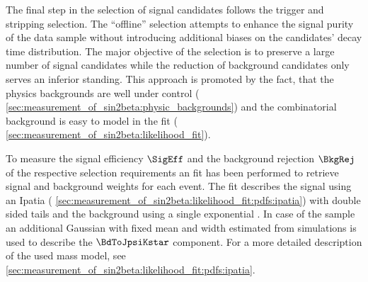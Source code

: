 The final step in the selection of signal candidates follows the trigger and
stripping selection. The \enquote{offline} selection attempts to enhance the
signal purity of the data sample without introducing additional biases on the
\Bd candidates' decay time distribution. The major objective of the selection is
to preserve a large number of signal candidates while the reduction of
background candidates only serves an inferior standing. This approach is
promoted by the fact, that the physics backgrounds are well under control (\cf
\cref{sec:measurement_of_sin2beta:physic_backgrounds}) and the combinatorial
background is easy to model in the fit (\cf
\cref{sec:measurement_of_sin2beta:likelihood_fit}).

To measure the signal efficiency $\SigEff$ and the background rejection
$\BkgRej$ of the respective selection requirements an \sPlot fit
\cite{Pivk:2004ty} has been performed to retrieve signal and background weights
for each event. The fit describes the signal using an Ipatia \PDF (\cf
\cref{sec:measurement_of_sin2beta:likelihood_fit:pdfs:ipatia}) with double sided
tails and the background using a single exponential \PDF. In case of the \catLL
sample an additional Gaussian \PDF with fixed mean and width estimated from \MC
simulations is used to describe the $\BdToJpsiKstar$ component. For a more
detailed description of the used mass model, see
\cref{sec:measurement_of_sin2beta:likelihood_fit:pdfs:ipatia}.

